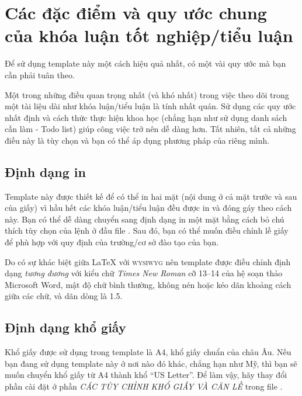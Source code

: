
\section{Các đặc điểm và quy ước chung của khóa luận tốt nghiệp/tiểu luận}\label{ThesisConventions}

Để sử dụng template này một cách hiệu quả nhất, có một vài quy ước mà bạn cần phải tuân theo.

Một trong những điều quan trọng nhất (và khó nhất) trong việc theo dõi trong một tài liệu dài như khóa luận/tiểu luận là tính nhất quán. Sử dụng các quy ước nhất định và cách thức thực hiện khoa học (chẳng hạn như sử dụng danh sách cần làm - Todo list) giúp công việc trở nên dễ dàng hơn. Tất nhiên, tất cả những điều này là tùy chọn và bạn có thể áp dụng phương pháp của riêng mình.


\subsection{Định dạng in}

Template này được thiết kế để có thể in hai mặt (nội dung ở cả mặt trước và sau của giấy) vì hầu hết các khóa luận/tiểu luận đều được in và đóng gáy theo cách này. Bạn có thể dễ dàng chuyển sang định dạng in một mặt bằng cách bỏ chú thích tùy chọn  của lệnh  ở đầu file . Sau đó, bạn có thể muốn điều chỉnh lề giấy để phù hợp với quy định của trường/cơ sở đào tạo của bạn.

Do có sự khác biệt giữa \LaTeX{} với \textsc{wysiwyg} nên template được điều chỉnh định dạng \emph{tương đương} với kiểu chữ \textit{Times New Roman} cỡ 13--14 của hệ soạn thảo Microsoft Word, mật độ chữ bình thường, không nén hoặc kéo dãn khoảng cách giữa các chữ, và dãn dòng là 1.5.


\subsection{Định dạng khổ giấy}

Khổ giấy được sử dụng trong template là A4, khổ giấy chuẩn của châu Âu. Nếu bạn đang sử dụng template này ở nơi nào đó khác, chẳng hạn như Mỹ, thì bạn sẽ muốn chuyển khổ giấy từ A4 thành khổ ``US Letter''. Để làm vậy, hãy thay đổi phần cài đặt ở phần \emph{CÁC TÙY CHỈNH KHỔ GIẤY VÀ CĂN LỀ} trong file .

